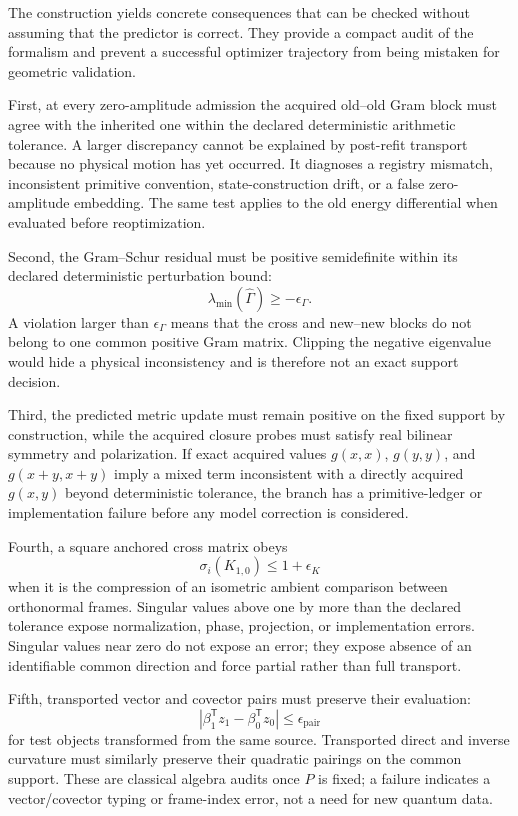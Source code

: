\documentclass[10pt,twocolumn]{article}
\theoremstyle{definition}
\theoremstyle{remark}
\begin{document}
The construction yields concrete consequences that can be checked without
assuming that the predictor is correct.  They provide a compact audit of the
formalism and prevent a successful optimizer trajectory from being mistaken
for geometric validation.

First, at every zero-amplitude admission the acquired old--old Gram block must
agree with the inherited one within the declared deterministic arithmetic
tolerance.  A larger discrepancy cannot be explained by post-refit transport
because no physical motion has yet occurred.  It diagnoses a registry
mismatch, inconsistent primitive convention, state-construction drift, or a
false zero-amplitude embedding.  The same test applies to the old energy
differential when evaluated before reoptimization.

Second, the Gram--Schur residual must be positive semidefinite within its
declared deterministic perturbation bound:
\begin{equation}
 \lambda_{\min}(\widehat\Gamma)
 \ge-\epsilon_\Gamma .
 \label{eq:appschuraudit}
\end{equation}
A violation larger than $\epsilon_\Gamma$ means that the cross and new--new
blocks do not belong to one common positive Gram matrix.  Clipping the
negative eigenvalue would hide a physical inconsistency and is therefore not
an exact support decision.

Third, the predicted metric update must remain positive on the fixed support
by construction, while the acquired closure probes must satisfy real
bilinear symmetry and polarization.  If exact acquired values
$g(x,x)$, $g(y,y)$, and $g(x+y,x+y)$ imply a mixed term inconsistent with a
directly acquired $g(x,y)$ beyond deterministic tolerance, the branch has a
primitive-ledger or implementation failure before any model correction is
considered.

Fourth, a square anchored cross matrix obeys
\begin{equation}
 \sigma_i(K_{1,0})\le1+\epsilon_K
 \label{eq:appcrosscontraction}
\end{equation}
when it is the compression of an isometric ambient comparison between
orthonormal frames.  Singular values above one by more than the declared
tolerance expose normalization, phase, projection, or implementation errors.  Singular values near
zero do not expose an error; they expose absence of an identifiable common
direction and force partial rather than full transport.

Fifth, transported vector and covector pairs must preserve their evaluation:
\begin{equation}
 \left|
 \beta_1^{\mathsf T}z_1-\beta_0^{\mathsf T}z_0
 \right|\le\epsilon_{\mathrm{pair}}
 \label{eq:apppairaudit}
\end{equation}
for test objects transformed from the same source.  Transported direct and
inverse curvature must similarly preserve their quadratic pairings on the
common support.  These are classical algebra audits once $P$ is fixed; a
failure indicates a vector/covector typing or frame-index error, not a need
for new quantum data.
\end{document}
